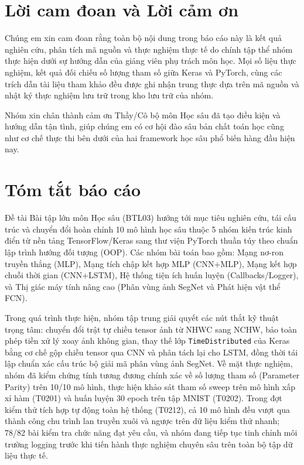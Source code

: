 \chapter*{Lời cam đoan và Lời cảm ơn}
Chúng em xin cam đoan rằng toàn bộ nội dung trong báo cáo này là kết quả nghiên cứu, phân tích mã nguồn và thực nghiệm thực tế do chính tập thể nhóm thực hiện dưới sự hướng dẫn của giảng viên phụ trách môn học. Mọi số liệu thực nghiệm, kết quả đối chiếu số lượng tham số giữa Keras và PyTorch, cùng các trích dẫn tài liệu tham khảo đều được ghi nhận trung thực dựa trên mã nguồn và nhật ký thực nghiệm lưu trữ trong kho lưu trữ của nhóm.

Nhóm xin chân thành cảm ơn Thầy/Cô bộ môn Học sâu đã tạo điều kiện và hướng dẫn tận tình, giúp chúng em có cơ hội đào sâu bản chất toán học cũng như cơ chế thực thi bên dưới của hai framework học sâu phổ biến hàng đầu hiện nay.

\chapter*{Tóm tắt báo cáo}
Đề tài Bài tập lớn môn Học sâu (BTL03) hướng tới mục tiêu nghiên cứu, tái cấu trúc và chuyển đổi hoàn chỉnh 10 mô hình học sâu thuộc 5 nhóm kiến trúc kinh điển từ nền tảng TensorFlow/Keras sang thư viện PyTorch thuần túy theo chuẩn lập trình hướng đối tượng (OOP). Các nhóm bài toán bao gồm: Mạng nơ-ron truyền thẳng (MLP), Mạng tích chập kết hợp MLP (CNN+MLP), Mạng kết hợp chuỗi thời gian (CNN+LSTM), Hệ thống tiện ích huấn luyện (Callbacks/Logger), và Thị giác máy tính nâng cao (Phân vùng ảnh SegNet và Phát hiện vật thể FCN).

Trong quá trình thực hiện, nhóm tập trung giải quyết các nút thắt kỹ thuật trọng tâm: chuyển đổi trật tự chiều tensor ảnh từ NHWC sang NCHW, bảo toàn phép tiền xử lý xoay ảnh không gian, thay thế lớp \texttt{TimeDistributed} của Keras bằng cơ chế gộp chiều tensor qua CNN và phân tách lại cho LSTM, đồng thời tái lập chuẩn xác cấu trúc bộ giải mã phân vùng ảnh SegNet. Về mặt thực nghiệm, nhóm đã kiểm chứng tính tương đương chính xác về số lượng tham số (Parameter Parity) trên 10/10 mô hình, thực hiện khảo sát tham số sweep trên mô hình xấp xỉ hàm (T0201) và huấn luyện 30 epoch trên tập MNIST (T0202). Trong đợt kiểm thử tích hợp tự động toàn hệ thống (T0212), cả 10 mô hình đều vượt qua thành công chu trình lan truyền xuôi và ngược trên dữ liệu kiểm thử nhanh; 78/82 bài kiểm tra chức năng đạt yêu cầu, và nhóm đang tiếp tục tinh chỉnh môi trường logging trước khi tiến hành thực nghiệm chuyên sâu trên toàn bộ tập dữ liệu thực tế.

